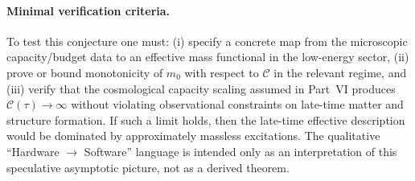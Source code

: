 \paragraph{Minimal verification criteria.}
To test this conjecture one must: (i) specify a concrete map from the microscopic capacity/budget data to an effective mass functional in the low-energy sector, (ii) prove or bound monotonicity of $m_0$ with respect to $\mathcal{C}$ in the relevant regime, and (iii) verify that the cosmological capacity scaling assumed in Part~VI produces $\mathcal{C}(\tau)\to\infty$ without violating observational constraints on late-time matter and structure formation.
If such a limit holds, then the late-time effective description would be dominated by approximately massless excitations. The qualitative ``Hardware $\to$ Software'' language is intended only as an interpretation of this speculative asymptotic picture, not as a derived theorem.

